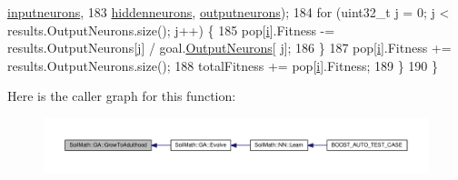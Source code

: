 \begin{DoxyCode}
      \hyperlink{class_soil_math_1_1_g_a_ac32591e30dde5ac854ae57a7b9e33298}{inputneurons},
183                                   \hyperlink{class_soil_math_1_1_g_a_a3f1eee7492f68a05b9b06ee8afb2ec20}{hiddenneurons}, \hyperlink{class_soil_math_1_1_g_a_ab454f9968d5ce2a294b89f85c9d3a74f}{outputneurons});
184     \textcolor{keywordflow}{for} (uint32\_t \hyperlink{_comparision_pictures_2_createtest_image_8m_ac86694252f8dfdb19aaeadc4b7c342c6}{j} = 0; \hyperlink{_comparision_pictures_2_createtest_image_8m_ac86694252f8dfdb19aaeadc4b7c342c6}{j} < results.OutputNeurons.size(); \hyperlink{_comparision_pictures_2_createtest_image_8m_ac86694252f8dfdb19aaeadc4b7c342c6}{j}++) \{
185       pop[\hyperlink{_comparision_pictures_2_createtest_image_8m_a6f6ccfcf58b31cb6412107d9d5281426}{i}].Fitness -= results.OutputNeurons[\hyperlink{_comparision_pictures_2_createtest_image_8m_ac86694252f8dfdb19aaeadc4b7c342c6}{j}] / goal.\hyperlink{struct_predict__struct_aa0708cae93baa061f21452537e86d3bd}{OutputNeurons}[
      \hyperlink{_comparision_pictures_2_createtest_image_8m_ac86694252f8dfdb19aaeadc4b7c342c6}{j}];
186     \}
187     pop[\hyperlink{_comparision_pictures_2_createtest_image_8m_a6f6ccfcf58b31cb6412107d9d5281426}{i}].Fitness += results.OutputNeurons.size();
188     totalFitness += pop[\hyperlink{_comparision_pictures_2_createtest_image_8m_a6f6ccfcf58b31cb6412107d9d5281426}{i}].Fitness;
189   \}
190 \}
\end{DoxyCode}


Here is the caller graph for this function\+:\nopagebreak
\begin{figure}[H]
\begin{center}
\leavevmode
\includegraphics[width=350pt]{class_soil_math_1_1_g_a_aff791f50f889beb74e854942f8883b58_icgraph}
\end{center}
\end{figure}


\hypertarget{class_soil_math_1_1_g_a_aa39c76b7958bfc80b713389a6f0c6b97}{}

